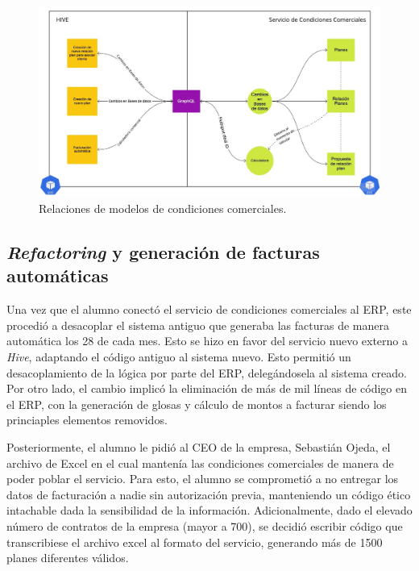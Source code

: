     \begin{figure}
      \centering
      \includegraphics[width=\linewidth]{figures/cc/cc_arquitectura.jpg}
      \caption{Relaciones de modelos de condiciones comerciales.}
      \label{fig:cc_arquitectura}
    \end{figure}
    
  \subsection{\textit{Refactoring} y generación de facturas automáticas}

    Una vez que el alumno conectó el servicio de condiciones comerciales al ERP, este procedió a desacoplar el sistema antiguo que generaba las facturas de manera automática los 28 de cada mes. Esto se hizo en favor del servicio nuevo externo a \textit{Hive}, adaptando el código antiguo al sistema nuevo. Esto permitió un desacoplamiento de la lógica por parte del ERP, delegándosela al sistema creado. Por otro lado, el cambio implicó la eliminación de más de mil líneas de código en el ERP, con la generación de glosas y cálculo de montos a facturar siendo los princiaples elementos removidos.

    Posteriormente, el alumno le pidió al CEO de la empresa, Sebastián Ojeda, el archivo de Excel en el cual mantenía las condiciones comerciales de manera de poder poblar el servicio. Para esto, el alumno se comprometió a no entregar los datos de facturación a nadie sin autorización previa, manteniendo un código ético intachable dada la sensibilidad de la información. Adicionalmente, dado el elevado número de contratos de la empresa (mayor a 700), se decidió escribir código que transcribiese el archivo excel al formato del servicio, generando más de 1500 planes diferentes válidos.

